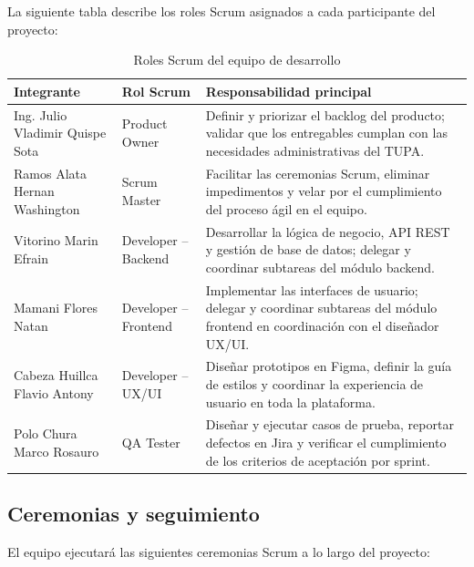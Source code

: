 La siguiente tabla describe los roles Scrum asignados a cada participante del proyecto:

\begin{table}[H]
\centering
\caption{Roles Scrum del equipo de desarrollo}
\label{tab:roles_scrum}
\begin{tabular}{|p{5cm}|p{3.5cm}|p{6cm}|}
\hline
\textbf{Integrante} & \textbf{Rol Scrum} & \textbf{Responsabilidad principal} \\
\hline
Ing. Julio Vladimir Quispe Sota & Product Owner &
Definir y priorizar el backlog del producto; validar que los entregables cumplan con
las necesidades administrativas del TUPA. \\
\hline
Ramos Alata Hernan Washington & Scrum Master &
Facilitar las ceremonias Scrum, eliminar impedimentos y velar por el cumplimiento
del proceso ágil en el equipo. \\
\hline
Vitorino Marin Efrain & Developer – Backend &
Desarrollar la lógica de negocio, API REST y gestión de base de datos; delegar y
coordinar subtareas del módulo backend. \\
\hline
Mamani Flores Natan & Developer – Frontend &
Implementar las interfaces de usuario; delegar y coordinar subtareas del módulo
frontend en coordinación con el diseñador UX/UI. \\
\hline
Cabeza Huillca Flavio Antony & Developer – UX/UI &
Diseñar prototipos en Figma, definir la guía de estilos y coordinar la experiencia
de usuario en toda la plataforma. \\
\hline
Polo Chura Marco Rosauro & QA Tester &
Diseñar y ejecutar casos de prueba, reportar defectos en Jira y verificar el
cumplimiento de los criterios de aceptación por sprint. \\
\hline
\end{tabular}
\end{table}

\subsection{Ceremonias y seguimiento}

El equipo ejecutará las siguientes ceremonias Scrum a lo largo del proyecto:

